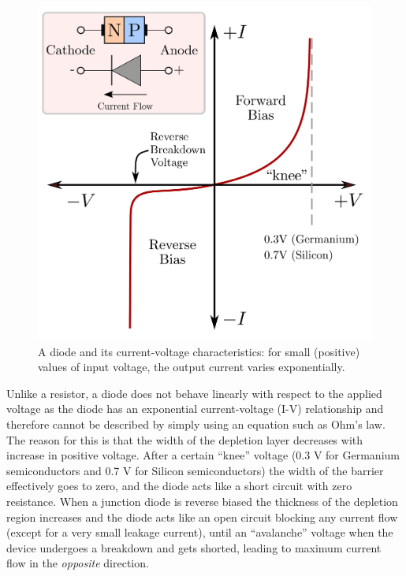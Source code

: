 \begin{refsection}
\begin{description}
\begin{figure}[!htb]
\centering
\includegraphics[scale=0.4]{figs/diode_characteristics.png}
\caption{A diode and its current-voltage characteristics: for small (positive) values of input voltage, the output current varies exponentially.}
\label{fig:diodeChar}
\end{figure}

Unlike a resistor, a diode does not behave linearly with respect to the applied voltage as the diode has an exponential current-voltage (I-V) relationship and therefore cannot be described by simply using an equation such as Ohm’s law. The reason for this is that the width of the depletion layer decreases with increase in positive voltage. After a certain ``knee'' voltage (0.3 V for Germanium semiconductors and 0.7 V for Silicon semiconductors) the width of the barrier effectively goes to zero, and the diode acts like a short circuit with zero resistance. When a junction diode is reverse biased the thickness of the depletion region increases and the diode acts like an open circuit blocking any current flow (except for a very small leakage current), until an ``avalanche'' voltage when the device undergoes a breakdown and gets shorted, leading to maximum current flow in the \textit{opposite} direction.


\end{description}





\end{refsection}

